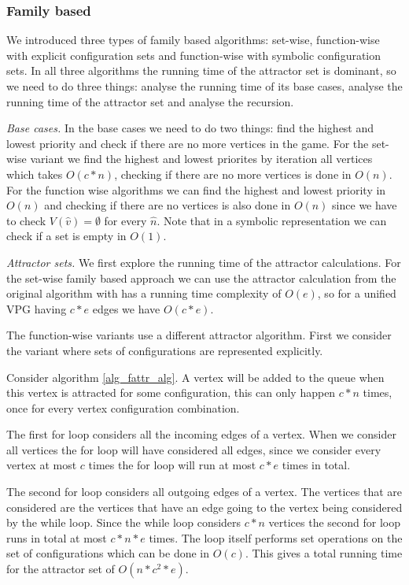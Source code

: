 \subsubsection{Family based}
We introduced three types of family based algorithms: set-wise, function-wise with explicit configuration sets and function-wise with symbolic configuration sets. In all three algorithms the running time of the attractor set is dominant, so we need to do three things: analyse the running time of its base cases, analyse the running time of the attractor set and analyse the recursion.

\textit{Base cases.} In the base cases we need to do two things: find the highest and lowest priority and check if there are no more vertices in the game. For the set-wise variant we find the highest and lowest priorites by iteration all vertices which takes $O(c*n)$, checking if there are no more vertices is done in $O(n)$. For the function wise algorithms we can find the highest and lowest priority in $O(n)$ and checking if there are no vertices is also done in $O(n)$ since we have to check $V(\hat{v}) = \emptyset$ for every $\hat{n}$. Note that in a symbolic representation we can check if a set is empty in $O(1)$.

\textit{Attractor sets.} We first explore the running time of the attractor calculations. For the set-wise family based approach we can use the attractor calculation from the original algorithm with has a running time complexity of $O(e)$, so for a unified VPG having $c*e$ edges we have $O(c*e)$.

The function-wise variants use a different attractor algorithm. First we consider the variant where sets of configurations are represented explicitly.

Consider algorithm \ref{alg_fattr_alg}. A vertex will be added to the queue when this vertex is attracted for some configuration, this can only happen $c*n$ times, once for every vertex configuration combination. 

The first for loop considers all the incoming edges of a vertex. When we consider all vertices the for loop will have considered all edges, since we consider every vertex at most $c$ times the for loop will run at most $c*e$ times in total.

The second for loop considers all outgoing edges of a vertex. The vertices that are considered are the vertices that have an edge going to the vertex being considered by the while loop. Since the while loop considers $c*n$ vertices the second for loop runs in total at most $c * n * e$ times. The loop itself performs set operations on the set of configurations which can be done in $O(c)$. This gives a total running time for the attractor set of $O(n*c^2*e)$.

